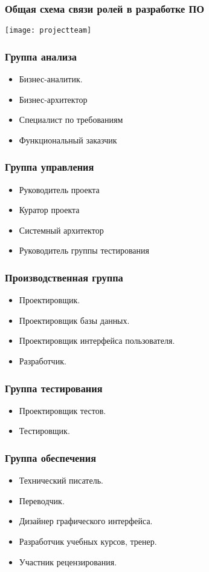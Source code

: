 \documentclass{../industrial-development}
\begin{document}
\begin{frame} \frametitle{Общая схема связи ролей в разработке ПО}
 \texttt{[image: projectteam]}
\end{frame}

\begin{frame} \frametitle{Группа анализа}
	\begin{itemize}
	\item Бизнес-аналитик.
	\item Бизнес-архитектор
	\item Специалист по требованиям
	\item Функциональный заказчик
	\end{itemize}
\end{frame}
	
\begin{frame} \frametitle{Группа управления}
	\begin{itemize}
		\item Руководитель проекта
		\item Куратор проекта
		\item Системный архитектор
		\item Руководитель группы тестирования
	\end{itemize}
	\end{frame}

\begin{frame} \frametitle{Производственная группа}
  \begin{itemize}
    \item Проектировщик. 
    \item Проектировщик базы данных.
    \item Проектировщик интерфейса пользователя.
    \item Разработчик.
  \end{itemize}
\end{frame}

\begin{frame} \frametitle{Группа тестирования}
  \begin{itemize}
    \item Проектировщик тестов.
    \item Тестировщик.
  \end{itemize}  
\end{frame}

\begin{frame} \frametitle{Группа обеспечения}
  \begin{itemize}
  \item Технический писатель.
  \item Переводчик.
  \item Дизайнер графического интерфейса.
  \item Разработчик учебных курсов, тренер.
  \item Участник рецензирования.
  \end{itemize}  
\end{frame}
\end{document}
